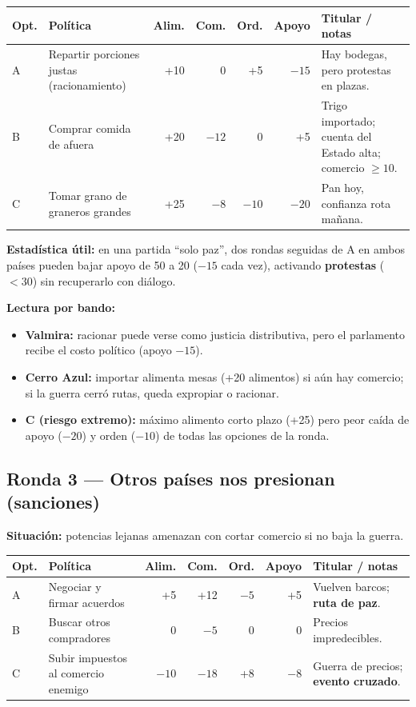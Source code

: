 \documentclass[11pt,a4paper]{article}
\begin{document}
\begin{longtable}{@{}p{0.9cm}p{4.2cm}rrrrp{3.2cm}@{}}
\toprule
\textbf{Opt.} & \textbf{Política} & \textbf{Alim.} & \textbf{Com.} & \textbf{Ord.} & \textbf{Apoyo} & \textbf{Titular / notas} \\
\midrule
A & Repartir porciones justas (racionamiento) & +10 & 0 & +5 & $-15$ &
  Hay bodegas, pero protestas en plazas. \\
B & Comprar comida de afuera & +20 & $-12$ & 0 & +5 &
  Trigo importado; cuenta del Estado alta; comercio $\geq 10$. \\
C & Tomar grano de graneros grandes & +25 & $-8$ & $-10$ & $-20$ &
  Pan hoy, confianza rota mañana. \\
\bottomrule
\end{longtable}

\textbf{Estadística útil:} en una partida ``solo paz'', dos rondas seguidas de A en ambos países pueden bajar apoyo de 50 a 20 ($-15$ cada vez), activando \textbf{protestas} ($<30$) sin recuperarlo con diálogo.

\textbf{Lectura por bando:}
\begin{itemize}
  \item \textbf{Valmira:} racionar puede verse como justicia distributiva, pero el parlamento recibe el costo político (apoyo $-15$).
  \item \textbf{Cerro Azul:} importar alimenta mesas (+20 alimentos) si aún hay comercio; si la guerra cerró rutas, queda expropiar o racionar.
  \item \textbf{C (riesgo extremo):} máximo alimento corto plazo (+25) pero peor caída de apoyo ($-20$) y orden ($-10$) de todas las opciones de la ronda.
\end{itemize}

\subsection{Ronda 3 --- Otros países nos presionan (sanciones)}

\textbf{Situación:} potencias lejanas amenazan con cortar comercio si no baja la guerra.

\begin{longtable}{@{}p{0.9cm}p{4.2cm}rrrrp{3.2cm}@{}}
\toprule
\textbf{Opt.} & \textbf{Política} & \textbf{Alim.} & \textbf{Com.} & \textbf{Ord.} & \textbf{Apoyo} & \textbf{Titular / notas} \\
\midrule
A & Negociar y firmar acuerdos & +5 & +12 & $-5$ & +5 &
  Vuelven barcos; \textbf{ruta de paz}. \\
B & Buscar otros compradores & 0 & $-5$ & 0 & 0 &
  Precios impredecibles. \\
C & Subir impuestos al comercio enemigo & $-10$ & $-18$ & +8 & $-8$ &
  Guerra de precios; \textbf{evento cruzado}. \\
\bottomrule
\end{longtable}
\end{document}
